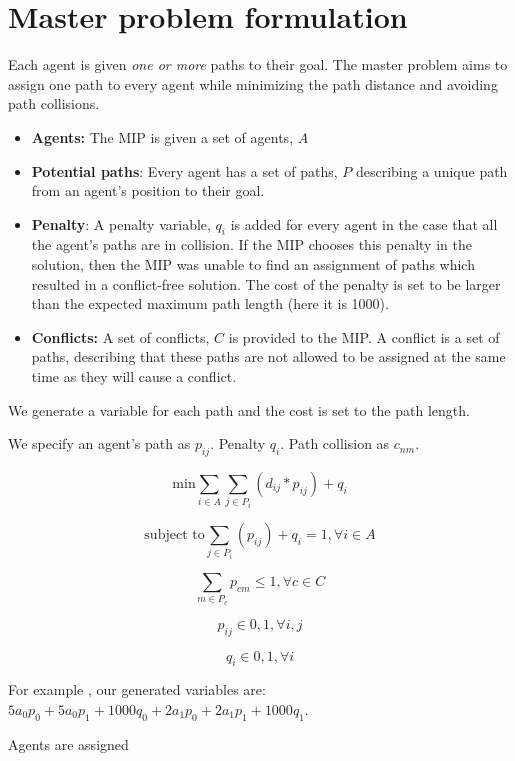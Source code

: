 \documentclass[a4paper,11pt]{article}
\begin{document}
\section{Master problem formulation} \label{sec:mip}

Each agent is given \textit{one or more} paths to their goal. The master problem aims to assign one path to every agent while minimizing the path distance and avoiding path collisions. 

\begin{itemize}
	\item \textbf{Agents:} The MIP is given a set of agents, $A$
	\item \textbf{Potential paths}: Every agent has a set of paths, $P$ describing a unique path from an agent's position to their goal.
	\item \textbf{Penalty}: A penalty variable, $q_i$ is added for every agent in the case that all the agent's paths are in collision. If the MIP chooses this penalty in the solution, then the MIP was unable to find an assignment of paths which resulted in a conflict-free solution. The cost of the penalty is set to be larger than the expected maximum path length (here it is 1000).
	\item \textbf{Conflicts:} A set of conflicts, $C$ is provided to the MIP. A conflict is a set of paths, describing that these paths are not allowed to be assigned at the same time as they will cause a conflict. 
\end{itemize}

We generate a variable for each path and the cost is set to the path length.

We specify an agent's path as $p_{ij}$. Penalty $q_i$. Path collision as $c_{nm}$.



\begin{equation} \label{mas:min}
\text{min} \sum_{i \in A} \sum_{j \in P_i} (d_{ij} * p_{ij}) + q_i
\end{equation}

\begin{equation} \label{mas:pick} %
\text{subject to} \sum_{j \in P_i} (p_{ij}) + q_i = 1, \forall i \in A
\end{equation}

\begin{equation} \label{mas:conflict} %
\sum_{m \in P_c} p_{cm} \le 1, \forall c \in C
\end{equation}

\begin{equation} \label{mas:path-one-or-zero} %
p_{ij} \in {0, 1}, \forall i, j
\end{equation}

\begin{equation} \label{mas:penalty} %
q_{i} \in {0, 1}, \forall i
\end{equation}

For example \cite{put example!}, our generated variables are: $5a_0p_0 + 5a_0p_1 + 1000q_0 + 2a_1p_0 + 2a_1p_1 + 1000q_1$.

Agents are assigned





	
\end{document}

